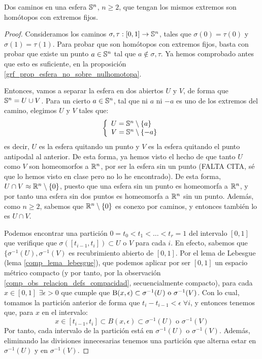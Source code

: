\begin{prop}
	\label{grf_homotop_caminos_esfera}
	Dos caminos en una esfera $\mathbb{S}^n$, $n\geq 2$, que tengan los mismos extremos son homótopos con extremos fijos.

	\begin{proof}
		Consideramos los caminos $\sigma,\tau:[0,1]\to \mathbb{S}^n$, tales que $\sigma(0)=\tau(0)$ y $\sigma(1)=\tau(1)$. Para probar que son homótopos con extremos fijos, basta con probar que existe un punto $a\in\mathbb{S}^n$ tal que $a\not\in \sigma,\tau$. Ya hemos comprobado antes que esto es suficiente, en la proposición \ref{grf_prop_esfera_no_sobre_nulhomotopa}.
		
		Entonces, vamos a separar la esfera en dos abiertos $U$ y $V$, de forma que $\mathbb{S}^n=U\cup V$. Para un cierto $a\in\mathbb{S}^n$, tal que ni $a$ ni $-a$ es uno de los extremos del camino, elegimos $U$ y $V$ tales que:
		\[\left\{\begin{array}{l}
			U = \mathbb{S}^n\setminus\{a\} \\
			V = \mathbb{S}^n\setminus\{-a\}
		\end{array}\right.\]
		es decir, $U$ es la esfera quitando un punto y $V$ es la esfera quitando el punto antipodal al anterior. De esta forma, ya hemos visto el hecho de que tanto $U$ como $V$ son homeomorfos a $\mathbb{R}^n$, por ser la esfera sin un punto (FALTA CITA, sé que lo hemos visto en clase pero no lo he encontrado). De esta forma, $U\cap V\approx\mathbb{R}^n\setminus\{0\}$, puesto que una esfera sin un punto es homeomorfa a $\mathbb{R}^n$, y por tanto una esfera sin dos puntos es homeomorfa a $\mathbb{R}^n$ sin un punto. Además, como $n\geq 2$, sabemos que $\mathbb{R}^n\setminus\{0\}$ es conexo por caminos, y entonces también lo es $U\cap V$. %
		
		Podemos encontrar una partición $0=t_0<t_1<\dots<t_r=1$ del intervalo $[0,1]$ que verifique que $\sigma([t_{i-1},t_i])\subset U\text{ o }V$ para cada $i$. En efecto, sabemos que $\{\sigma^{-1}(U), \sigma^{-1}(V)$ es recubrimiento abierto de $[0,1]$. Por el lema de Lebesgue (lema \ref{comp_lema_lebesgue}), que podemos aplicar por ser $[0,1]$ un espacio métrico compacto (y por tanto, por la observación \ref{comp_obs_relacion_defs_compacidad}, secuencialmente compacto), para cada $x\in [0,1]$ $\exists\epsilon>0$ que cumple que $\operatorname{B}(x,\epsilon)\subset\sigma^{-1}(U)\text{ o }\sigma^{-1}(V)$. Con lo cual, tomamos la partición anterior de forma que $t_i-t_{i-1}<\epsilon\;\forall i$, y entonces tenemos que, para $x$ en el intervalo:
		\[x\in [t_{i-1}, t_i]\subset B(x,\epsilon)\subset\sigma^{-1}(U)\text{ o }\sigma^{-1}(V)\]
		Por tanto, cada intervalo de la partición está en $\sigma^{-1}(U)$ o $\sigma^{-1}(V)$. Además, eliminando las divisiones innecesarias tenemos una partición que alterna estar en $\sigma^{-1}(U)$ y en $\sigma^{-1}(V)$.
		

\end{proof}
\end{prop}
